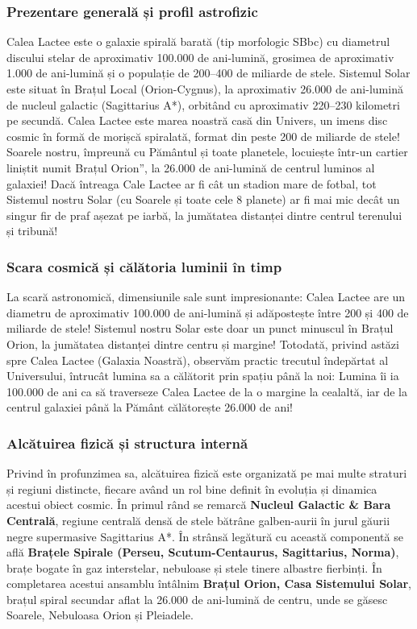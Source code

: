 \subsubsection*{Prezentare generală și profil astrofizic}
Calea Lactee este o galaxie spirală barată (tip morfologic SBbc) cu diametrul discului stelar de aproximativ 100.000 de ani-lumină, grosimea de aproximativ 1.000 de ani-lumină și o populație de 200--400 de miliarde de stele. Sistemul Solar este situat în Brațul Local (Orion-Cygnus), la aproximativ 26.000 de ani-lumină de nucleul galactic (Sagittarius A*), orbitând cu aproximativ 220--230 kilometri pe secundă. Calea Lactee este marea noastră casă din Univers, un imens disc cosmic în formă de morișcă spiralată, format din peste 200 de miliarde de stele! Soarele nostru, împreună cu Pământul și toate planetele, locuiește într-un cartier liniștit numit \quotedblbase{}Brațul Orion\textquotedblright{}, la 26.000 de ani-lumină de centrul luminos al galaxiei! Dacă întreaga Cale Lactee ar fi cât un stadion mare de fotbal, tot Sistemul nostru Solar (cu Soarele și toate cele 8 planete) ar fi mai mic decât un singur fir de praf așezat pe iarbă, la jumătatea distanței dintre centrul terenului și tribună!

\subsubsection*{Scara cosmică și călătoria luminii în timp}
La scară astronomică, dimensiunile sale sunt impresionante: Calea Lactee are un diametru de aproximativ 100.000 de ani-lumină și adăpostește între 200 și 400 de miliarde de stele! Sistemul nostru Solar este doar un punct minuscul în Brațul Orion, la jumătatea distanței dintre centru și margine! Totodată, privind astăzi spre Calea Lactee (Galaxia Noastră), observăm practic trecutul îndepărtat al Universului, întrucât lumina sa a călătorit prin spațiu până la noi: Lumina îi ia 100.000 de ani ca să traverseze Calea Lactee de la o margine la cealaltă, iar de la centrul galaxiei până la Pământ călătorește 26.000 de ani!

\subsubsection*{Alcătuirea fizică și structura internă}
Privind în profunzimea sa, alcătuirea fizică este organizată pe mai multe straturi și regiuni distincte, fiecare având un rol bine definit în evoluția și dinamica acestui obiect cosmic. În primul rând se remarcă \textbf{Nucleul Galactic \& Bara Centrală}, regiune centrală densă de stele bătrâne galben-aurii în jurul găurii negre supermasive Sagittarius A*. În strânsă legătură cu această componentă se află \textbf{Brațele Spirale (Perseu, Scutum-Centaurus, Sagittarius, Norma)}, brațe bogate în gaz interstelar, nebuloase și stele tinere albastre fierbinți. În completarea acestui ansamblu întâlnim \textbf{Brațul Orion, Casa Sistemului Solar}, brațul spiral secundar aflat la 26.000 de ani-lumină de centru, unde se găsesc Soarele, Nebuloasa Orion și Pleiadele.

